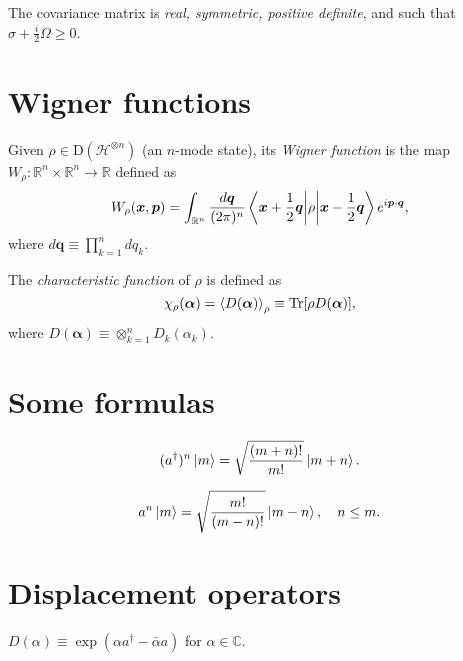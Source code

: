 \documentclass[12pt]{report}
\newcommand{\CC}{\mathbb{C}}
\newcommand{\RR}{\mathbb{R}}
\newcommand{\bs}[1]{\boldsymbol{#1}}
\newcommand{\calH}{{\mathcal{H}}}
\newcommand{\rmD}{{\mathrm{D}}}
\begin{document}
\begin{prop}
	The covariance matrix is \emph{real, symmetric, positive definite}, and such that $\sigma+\frac{i}{2}\Omega\ge0$.
\end{prop}

\section{Wigner functions}

\begin{defn}
	Given $\rho\in\rmD(\calH^{\otimes n})$ (an $n$-mode state), its \emph{Wigner function} is the map $W_\rho:\RR^{n}\times\RR^n\to \RR$ defined as
	\begin{equation}
		W_\rho(\bs x,\bs p)
		= \int_{\RR^n} \frac{d\bs q}{(2\pi)^n}
		\mel{\bs x+\frac12\bs q}{\rho}{\bs x-\frac12 \bs q}
		e^{i \bs p\cdot\bs q},
	\end{equation}
	where $d\bs q\equiv \prod_{k=1}^n dq_k$.
\end{defn}

\begin{defn}
	The \emph{characteristic function} of $\rho$ is defined as
	\begin{equation}
		\chi_\rho(\bs\alpha)
		= \expval{D(\bs\alpha)}_\rho
		\equiv \Tr[\rho D(\bs\alpha)],
	\end{equation}
	where $D(\bs\alpha)\equiv \otimes_{k=1}^n D_k(\alpha_k)$.
\end{defn}

\section{Some formulas}

\begin{equation}
	(a^\dagger)^n \ket m 
	= \sqrt{\frac{(m+n)!}{m!}} \ket{m+n}.
\end{equation}

\begin{equation}
	a^n \ket m = \sqrt{\frac{m!}{(m-n)!}} \ket{m-n},\quad n\le m.
\end{equation}

\section{Displacement operators}

\begin{defn}
	$D(\alpha) \equiv \exp(\alpha a^\dagger-\bar\alpha a)$ for $\alpha\in\CC$.
\end{defn}
\end{document}

